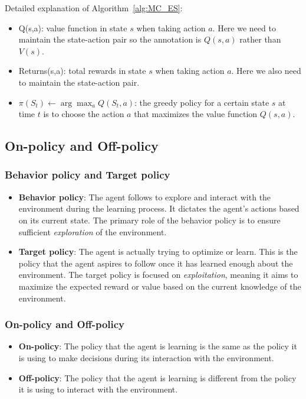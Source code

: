 Detailed explanation of Algorithm~\ref{alg:MC_ES}:

\begin{itemize}
    \item Q(s,a): value function in state $s$ when taking action $a$. Here we need to maintain the state-action pair so the annotation is $Q(s,a)$ rather than $V(s)$.
    \item Returns(s,a): total rewards in state $s$ when taking action $a$. Here we also need to maintain the state-action pair.
    \item $\pi(S_t) \leftarrow \arg\max_a Q(S_t, a)$: the greedy policy for a certain state $s$ at time $t$ is to choose the action $a$ that maximizes the value function $Q(s,a)$.
\end{itemize}

\subsection{On-policy and Off-policy}

\subsubsection{Behavior policy and Target policy}

\begin{itemize}
    \item \textbf{Behavior policy}: The agent follows to explore and interact with the environment during the learning process. It dictates the agent's actions based on its current state. The primary role of the behavior policy is to ensure sufficient \emph{exploration} of the environment.
    \item \textbf{Target policy}: The agent is actually trying to optimize or learn. This is the policy that the agent aspires to follow once it has learned enough about the environment. The target policy is focused on \emph{exploitation}, meaning it aims to maximize the expected reward or value based on the current knowledge of the environment.
\end{itemize}

\subsubsection{On-policy and Off-policy}

\begin{itemize}
    \item \textbf{On-policy}: The policy that the agent is learning is the same as the policy it is using to make decisions during its interaction with the environment.
    \item \textbf{Off-policy}: The policy that the agent is learning is different from the policy it is using to interact with the environment.
\end{itemize}

